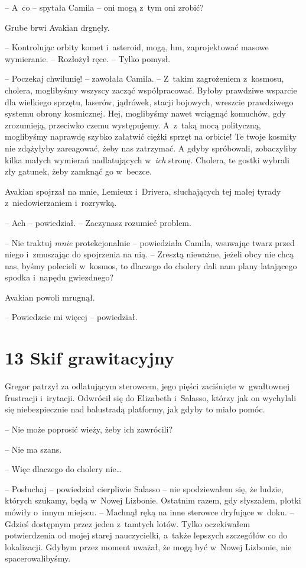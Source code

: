 \documentclass[oneside,polish,12pt,sfheadings]{mwbk}
\begin{document}
-- A~co -- spytała Camila -- oni mogą z~tym oni zrobić?

Grube brwi Avakian drgnęły. 

-- Kontrolując orbity komet i~asteroid, mogą,
hm, zaprojektować masowe wymieranie. -- Rozłożył ręce. -- Tylko pomysł.

-- Poczekaj chwilunię! -- zawołała Camila. -- Z~takim zagrożeniem z~kosmosu,
cholera, moglibyśmy wszyscy zacząć współpracować. Byłoby prawdziwe
wsparcie dla wielkiego sprzętu, laserów, jądrówek, stacji bojowych,
wreszcie prawdziwego systemu obrony kosmicznej. Hej, moglibyśmy nawet
wciągnąć komuchów, gdy zrozumieją, przeciwko czemu występujemy. A~z~taką
mocą polityczną, moglibyśmy naprawdę szybko załatwić ciężki sprzęt na
orbicie! Te twoje kosmity nie zdążyłyby zareagować, żeby nas zatrzymać. A
gdyby spróbowali, zobaczyliby kilka małych wymierań nadlatujących w~\emph{ich} stronę. Cholera, te gostki wybrali zły gatunek, żeby zamknąć
go w~beczce.

Avakian spojrzał na mnie, Lemieux i~Drivera, słuchających tej małej
tyrady z~niedowierzaniem i~rozrywką.

-- Ach -- powiedział. -- Zaczynasz rozumieć problem.

-- Nie traktuj \emph{mnie} protekcjonalnie -- powiedziała Camila, wsuwając
twarz przed niego i~zmuszając do spojrzenia na nią. -- Zresztą nieważne,
jeżeli obcy nie chcą nas, byśmy polecieli w~kosmos, to dlaczego do
cholery dali nam plany latającego spodka i~napędu gwiezdnego?

Avakian powoli mrugnął. 

-- Powiedzcie mi więcej -- powiedział.

\chapter[Skif grawitacyjny]{13 Skif grawitacyjny}





Gregor patrzył za odlatującym sterowcem, jego pięści zaciśnięte w~gwałtownej frustracji i~irytacji. Odwrócił się do Elizabeth i~Salasso,
którzy jak on wychylali się niebezpiecznie nad balustradą platformy, jak
gdyby to miało pomóc.

-- Nie może poprosić wieży, żeby ich zawrócili?

-- Nie ma szans.

-- Więc dlaczego do cholery nie\ldots

-- Posłuchaj -- powiedział cierpliwie Salasso -- nie spodziewałem się, że
ludzie, których szukamy, będą w~Nowej Lizbonie. Ostatnim razem, gdy
słyszałem, plotki mówiły o~innym miejscu. -- Machnął ręką na inne
sterowce dryfujące w~doku. -- Gdzieś dostępnym przez jeden z~tamtych
lotów. Tylko oczekiwałem potwierdzenia od mojej starej nauczycielki, a~także lepszych szczegółów co do lokalizacji. Gdybym przez moment uważał,
że mogą być w~Nowej Lizbonie, nie spacerowalibyśmy.
\end{document}
